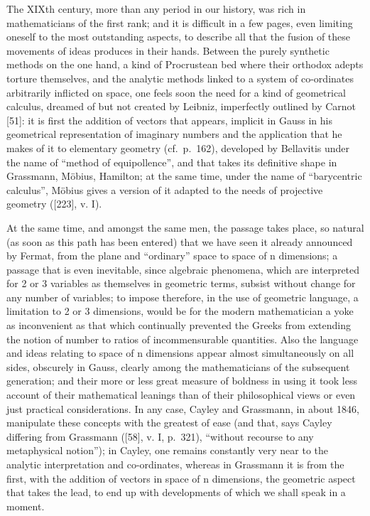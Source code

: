 The XIXth century, more than any period in our history, was rich in mathematicians of the first rank; and it is difficult in a few pages, even limiting oneself to the most outstanding aspects, to describe all that the fusion of these movements of ideas produces in their hands. Between the purely synthetic methods on the one hand, a kind of Procrustean bed where their orthodox adepts torture themselves, and the analytic methods linked to a system of co-ordinates arbitrarily inflicted on space, one feels soon the need for a kind of geometrical calculus, dreamed of but not created by Leibniz, imperfectly outlined by Carnot {[}51{]}: it is first the addition of vectors that appears, implicit in Gauss in his geometrical representation of imaginary numbers and the application that he makes of it to elementary geometry (cf.~p.~162), developed by Bellavitis under the name of ``method of equipollence'', and that takes its definitive shape in Grassmann, Möbius, Hamilton; at the same time, under the name of ``barycentric calculus'', Möbius gives a version of it adapted to the needs of projective geometry ({[}223{]}, v. I).

At the same time, and amongst the same men, the passage takes place, so natural (as soon as this path has been entered) that we have seen it already announced by Fermat, from the plane and ``ordinary'' space to space of n dimensions; a passage that is even inevitable, since algebraic phenomena, which are interpreted for 2 or 3 variables as themselves in geometric terms, subsist without change for any number of variables; to impose therefore, in the use of geometric language, a limitation to 2 or 3 dimensions, would be for the modern mathematician a yoke as inconvenient as that which continually prevented the Greeks from extending the notion of number to ratios of incommensurable quantities. Also the language and ideas relating to space of n dimensions appear almost simultaneously on all sides, obscurely in Gauss, clearly among the mathematicians of the subsequent generation; and their more or less great measure of boldness in using it took less account of their mathematical leanings than of their philosophical views or even just practical considerations. In any case, Cayley and Grassmann, in about 1846, manipulate these concepts with the greatest of ease (and that, says Cayley differing from Grassmann ({[}58{]}, v. I, p.~321), ``without recourse to any metaphysical notion''); in Cayley, one remains constantly very near to the analytic interpretation and co-ordinates, whereas in Grassmann it is from the first, with the addition of vectors in space of n dimensions, the geometric aspect that takes the lead, to end up with developments of which we shall speak in a moment.

